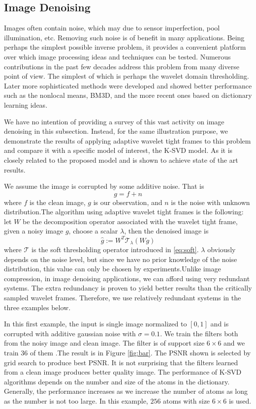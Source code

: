 \documentclass[a4paper]{article}
\begin{document}
\subsection{Image Denoising}
Images often contain noise, which may due to sensor imperfection, pool illumination, etc. Removing such noise is of benefit in many applications. Being perhaps the simplest possible inverse problem, it provides a convenient platform over which image processing ideas and techniques can be tested. Numerous contributions in the past few decades address this problem from many diverse point of view. The simplest of which is perhaps the wavelet domain thresholding. Later more sophisticated methods were developed and showed better performance such as the nonlocal means\cite{buades2005non}, BM3D\cite{dabov2007image}, and the more recent ones based on dictionary learning ideas\cite{elad2006image}. 

We have no intention of providing a survey of this vast activity on image denoising in this subsection. Instead, for the same illustration purpose, we demonstrate the results of applying adaptive wavelet tight frames to this problem and compare it with a specific model of interest, the K-SVD model\cite{elad2006image}. As it is closely related to the proposed model and is shown to achieve state of the art results.

We assume the image is corrupted by some additive noise. That is 
\[
g=f+n
\]
where $f$ is the clean image, $g$ is our observation, and $n$ is the noise with unknown distribution.The algorithm using adaptive wavelet tight frames is the following: let $W$ be the decomposition operator associated with the wavelet tight frame, given a noisy image $g$, choose a scalar $\lambda$, then the denoised image is
\[
\hat{g} :=W^T \mathcal{T}_{\lambda} (Wg)
\]
where $\mathcal{T}$ is the soft thresholding operator introduced in \eqref{eq:soft}. $\lambda$ obviously depends on the noise level, but since we have no prior knowledge of the noise distribution, this value can only be chosen by experiments.Unlike image compression, in image denoising applications, we can afford using very redundant systems. The extra redundancy is proven to yield better results than the critically sampled wavelet frames. Therefore, we use relatively redundant systems in the three examples below.

In this first example, the input is single image normalized to $[0,1]$ and is corrupted with additive gaussian noise with $\sigma=0.1$. We train the filters both from the noisy image and clean image. The filter is of support size $6\times 6$ and we train $36$ of them .The result is in Figure \ref{fig:bar}.  The PSNR shown is selected by grid search to produce best PSNR. It is not surprising that the filters learned from a clean image produces better quality image. The performance of K-SVD algorithms depends on the number and size of the atoms in the dictionary. Generally, the performance increases as we increase the number of atoms as long as the number is not too large. In this example, $256$ atoms with size $6\times 6$ is used.
\end{document}
